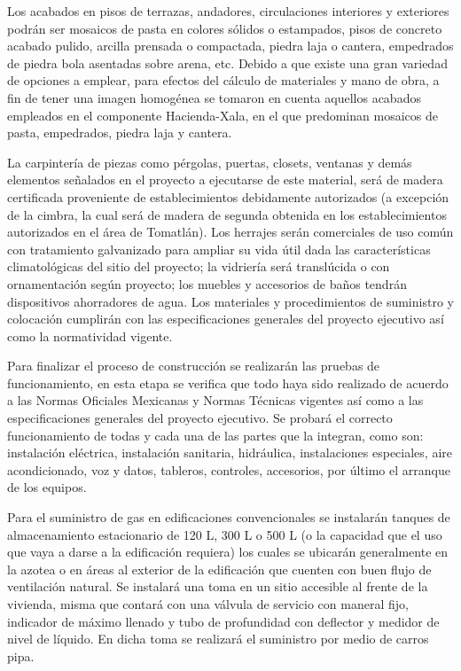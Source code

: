 \documentclass{article}
\begin{document}
\bigskip

Los acabados en pisos de terrazas, andadores, circulaciones interiores y exteriores podrán ser mosaicos de pasta en colores sólidos o estampados, pisos de concreto acabado pulido, arcilla prensada o compactada, piedra laja o cantera, empedrados de piedra bola asentadas sobre arena, etc. Debido a que existe una gran variedad de opciones a emplear, para efectos del cálculo de materiales y mano de obra, a fin de tener una imagen homogénea se tomaron en cuenta aquellos acabados empleados en el componente Hacienda-Xala, en el que predominan mosaicos de pasta, empedrados, piedra laja y cantera.


\bigskip

La carpintería de piezas como pérgolas, puertas, closets, ventanas y demás elementos señalados en el proyecto a ejecutarse de este material, será de madera certificada proveniente de establecimientos debidamente autorizados (a excepción de la cimbra, la cual será de madera de segunda obtenida en los establecimientos autorizados en el área de Tomatlán). Los herrajes serán comerciales de uso común con tratamiento galvanizado para ampliar su vida útil dada las características climatológicas del sitio del proyecto; la vidriería será translúcida o con ornamentación según proyecto; los muebles y accesorios de baños tendrán dispositivos ahorradores de agua. Los materiales y procedimientos de suministro y colocación cumplirán con las especificaciones generales del proyecto ejecutivo así como la normatividad vigente.


\bigskip

Para finalizar el proceso de construcción se realizarán las pruebas de funcionamiento, en esta etapa se verifica que todo haya sido realizado de acuerdo a las Normas Oficiales Mexicanas y Normas Técnicas vigentes así como a las especificaciones generales del proyecto ejecutivo. Se probará el correcto funcionamiento de todas y cada una de las partes que la integran, como son: instalación eléctrica, instalación sanitaria, hidráulica, instalaciones especiales, aire acondicionado, voz y datos, tableros, controles, accesorios, por último el arranque de los equipos.


\bigskip

Para el suministro de gas en edificaciones convencionales se instalarán tanques de almacenamiento estacionario de 120 L, 300 L o 500 L (o la capacidad que el uso que vaya a darse a la edificación requiera) los cuales se ubicarán generalmente en la azotea o en áreas al exterior de la edificación que cuenten con buen flujo de ventilación natural. Se instalará una toma en un sitio accesible al frente de la vivienda, misma que contará con una válvula de servicio con maneral fijo, indicador de máximo llenado y tubo de profundidad con deflector y medidor de nivel de líquido. En dicha toma se realizará el suministro por medio de carros pipa. 
\end{document}
